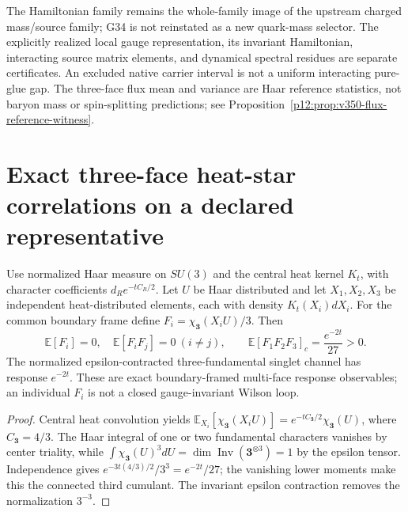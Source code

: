 \documentclass[12pt,a4paper]{article}
\begin{document}
\begin{remark}
\label{p10:rem:v350-qcd-physical-firewalls}
The Hamiltonian family remains the whole-family image of the upstream
charged mass/source family; G34 is not reinstated as a new quark-mass
selector. The explicitly realized local gauge representation,
its invariant Hamiltonian, interacting source matrix elements,
and dynamical spectral residues are separate certificates. An excluded
native carrier interval is not a uniform interacting pure-glue gap.
The three-face flux mean and variance are Haar reference statistics,
not baryon mass or spin-splitting predictions; see
Proposition~\ref{p12:prop:v350-flux-reference-witness}.
\end{remark}

\section{Exact three-face heat-star correlations on a declared representative}
\label{p10:sec:v356-heat-star}

\begin{theorem}
\label{p10:thm:v356-heat-star-cumulant}
Use normalized Haar measure on $SU(3)$ and the central heat kernel
$K_t$, with character coefficients
$d_Re^{-tC_R/2}$.  Let $U$ be Haar distributed and let
$X_1,X_2,X_3$ be independent heat-distributed elements, each with
density $K_t(X_i)dX_i$.  For the common boundary frame define
$F_i=\chi_{\mathbf3}(X_iU)/3$.  Then
\[
 \mathbb E[F_i]=0,\quad
 \mathbb E[F_iF_j]=0\ (i\ne j),\qquad
 \boxed{\mathbb E[F_1F_2F_3]_c=\frac{e^{-2t}}{27}>0.}
\]
The normalized epsilon-contracted three-fundamental singlet
channel has response $e^{-2t}$.  These are exact boundary-framed
multi-face response observables; an individual $F_i$ is not a
closed gauge-invariant Wilson loop.
\end{theorem}
\begin{proof}
Central heat convolution yields
$\mathbb E_{X_i}[\chi_{\mathbf3}(X_iU)]
=e^{-tC_{\mathbf3}/2}\chi_{\mathbf3}(U)$,
where $C_{\mathbf3}=4/3$.  The Haar integral of one or two
fundamental characters vanishes by center triality, while
$\int\chi_{\mathbf3}(U)^3dU=\dim\operatorname{Inv}
(\mathbf3^{\otimes3})=1$ by the epsilon tensor.  Independence gives
$e^{-3t(4/3)/2}/3^3=e^{-2t}/27$; the vanishing lower moments
make this the connected third cumulant.  The invariant epsilon
contraction removes the normalization $3^{-3}$.
\end{proof}
\end{document}
